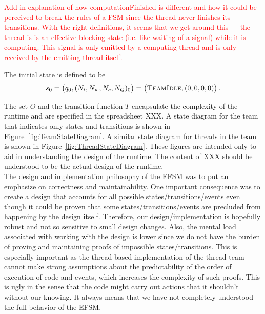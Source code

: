 \documentclass{article}
\newcommand{\TeamIdle}          {\textsc{TeamIdle}}
\begin{document}
\textcolor{red}{Add in explanation of how computationFinished is different and
how it could be perceived to break the rules of a FSM since the thread never
finishes its transitions.  With the right definitions, it seems that we get
around this --- the thread is is an effective blocking state (i.e. like waiting
of a signal) while it is computing.  This signal is only emitted by a computing
thread and is only received by the emitting thread itself.}

The initial state is defined to be
\[
s_0 = \left(q_0, (N_i, N_w, N_c, N_Q)_0\right) = \left(\TeamIdle, (0, 0, 0, 0)\right).
\]

The set $O$ and the transition function $T$ encapsulate the complexity of the
runtime and are specified in the spreadsheet XXX.  A state diagram for the team
that indicates only states and transitions is shown in
Figure~\ref{fig:TeamStateDiagram}.  A similar state diagram for threads in the
team is shown in Figure~\ref{fig:ThreadStateDiagram}.  These figures are
intended only to aid in understanding the design of the runtime.  The content of
XXX should be understood to be the actual design of the runtime.\\

The design and implementation philosophy of the EFSM was to put an emphasize on
correctness and maintainability.  One important consequence was to create a
design that accounts for all possible states/transitions/events even though it
could be proven that some states/transitions/events are precluded from happening
by the design itself.  Therefore, our design/implementation is hopefully robust
and not so sensitive to small design changes.  Also, the mental load associated
with working with the design is lower since we do not have the burden of proving
and maintaining proofs of impossible states/transitions.  This is especially
important as the thread-based implementation of the thread team cannot make
strong assumptions about the predictability of the order of execution of code
and events, which increases the complexity of such proofs.  This is ugly in the
sense that the code might carry out actions that it shouldn't without our
knowing.  It always means that we have not completely understood the full
behavior of the EFSM.
\end{document}

